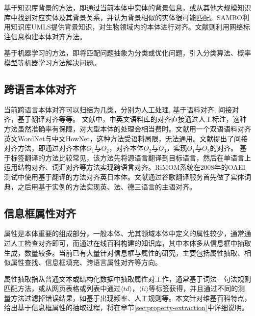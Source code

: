 {\heiti 基于知识库背景的方法}，即通过当前本体中实体的背景信息，或从其他大规模知识库中找到对应实体及其背景关系，并认为背景相似的实体很可能匹配。SAMBO\cite{lambrix2006sambo}利用知识库UMLS提供背景知识，对生物领域内的本体进行对齐。文献\cite{wartena2008instanced}则利用网络标注信息构建本体对齐方法。

{\heiti 基于机器学习的方法\cite{niepert2010probabilistic,albagli2012markov}}，即将匹配问题抽象为分类或优化问题，引入分类算法、概率模型等机器学习方法解决问题。

\subsection{跨语言本体对齐}
当前跨语言本体对齐可以归结为几类，分别为人工处理\cite{liang2006mapping}, 基于语料对齐\cite{ngai2002identifying}, 间接对齐\cite{jung2009indirect}，基于翻译对齐\cite{zhang2008rimom,wang2009matching}等等。 文献\cite{liang2006mapping}中，中英文语料库的对齐直接通过人工标注，这种方法虽然准确率有保障，对大型本体的处理会相当费时。文献\cite{ngai2002identifying}用一个双语语料对齐英文WordNet与中文HowNet，这种方法受语料局限，无法通用。文献\cite{jung2009indirect}提出了间接对齐方法，即通过对齐本体$O_1$与$O_2$，对齐本体$O_2$与$O_3$，实现$O_1$与$O_3$的对齐。 
基于标签翻译的方法比较常见，该方法先将源语言翻译到目标语言，然后在单语言上运用结构对齐、词汇对齐等方法实现跨语言对齐。RiMOM系统\cite{zhang2008rimom}在2008年的OAEI测试中使用基于翻译的方法对齐英日本体。文献\cite{wang2009matching}通过谷歌翻译服务首先做了实体词典，之后用基于实例的方法实现英、法、德三语言的主语对齐。

\subsection{信息框属性对齐}
\label{sec:property-research}
属性是本体重要的组成部分，一般本体、尤其领域本体中定义的属性较少，通常通过人工检查对齐即可\cite{wang:movie}，而通过在线百科构建的知识库，其中本体多从信息框中抽取生成，数量较多。当前已有大量针对信息框与属性的研究，主要包括属性抽取、相似属性查找、信息框填充、跨语言属性对齐等方向。

{\heiti 属性抽取}指从普通文本或结构化数据中抽取属性对工作，通常基于词法—句法规则匹配方法\cite{pacsca2007role,lee2013attribute}，或从网页表格或列表中通过$\langle td\rangle$，$\langle li\rangle$等标签获得\cite{crestan2010web}，并且通过不同的测量方法过滤掉错误结果，如基于出现频率\cite{pacsca2007role}、人工规则\cite{lee2013attribute}等。本文针对维基百科特点，给出基于信息框属性的抽取过程，将在章节\ref{sec:property-extraction}中详细说明。

